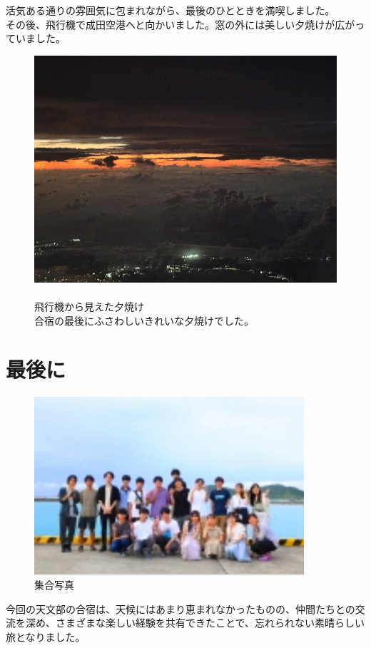 \documentclass[../main]{subfiles}
\begin{document}
活気ある通りの雰囲気に包まれながら、最後のひとときを満喫しました。\\
その後、飛行機で成田空港へと向かいました。窓の外には美しい夕焼けが広がっていました。
\begin{figure}[H]
  \begin{minipage}[c]{0.49\textwidth}
  \includegraphics[width=\columnwidth]{figure/yuuyake.jpeg}
  \end{minipage}
  \hspace{0.04\columnwidth} %
  \begin{minipage}[c]{0.4\textwidth}
    \caption{\\
    飛行機から見えた夕焼け\\
    合宿の最後にふさわしいきれいな夕焼けでした。
    }
  \end{minipage}
\end{figure}
\section{最後に}
\begin{figure}[H]
  \centering
  \includegraphics[width=10cm]{figure/syuugousyasinn.JPG}
  \caption{集合写真}
\end{figure}
今回の天文部の合宿は、天候にはあまり恵まれなかったものの、仲間たちとの交流を深め、さまざまな楽しい経験を共有できたことで、忘れられない素晴らしい旅となりました。
\end{document}
